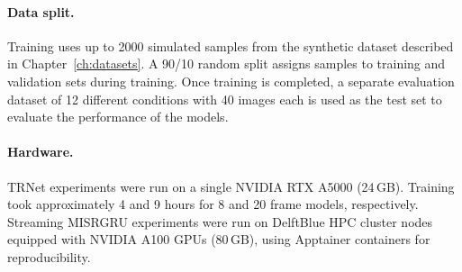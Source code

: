 \paragraph{Data split.}
Training uses up to 2000 simulated samples from the synthetic dataset described in
Chapter~\ref{ch:datasets}.
A 90/10 random split assigns samples to training and validation sets during training.
Once training is completed, a separate evaluation dataset of 12 different conditions with 40 images
each is used as the test set to evaluate the performance of the models.

\paragraph{Hardware.}
TRNet experiments were run on a single NVIDIA RTX A5000 (24\,GB). Training took approximately 4 and 9 hours
for 8 and 20 frame models, respectively.
Streaming MISRGRU experiments were run on DelftBlue HPC cluster nodes equipped with
NVIDIA A100 GPUs (80\,GB), using Apptainer containers for reproducibility.




